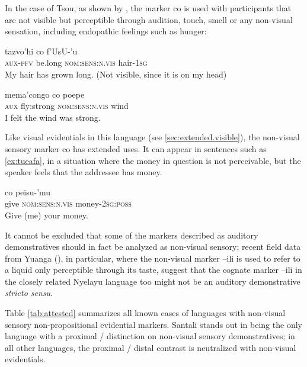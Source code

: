 \documentclass[oneside,a4paper,11pt]{article}
\newcommand{\ipa}[1]{{\phon \mbox{#1}}} %
\begin{document}
In the case of Tsou, as shown by \citet[50-1]{yang00tsou.case}, the marker \ipa{co} is used with participants that are not visible but perceptible through audition, touch, smell or any non-visual sensation, including endopathic feelings such as hunger:


\begin{exe}
\ex 
\gll \ipa{mi-cu} \ipa{tazvo'hi} \ipa{co} \ipa{f'UsU-'u} \\
\textsc{aux-pfv} be.long \textsc{nom:sens:n.vis} hair-\textsc{1sg} \\
\glt My hair has grown long. (Not visible, since it is on my head)
\end{exe}

\begin{exe}
\ex 
\gll \ipa{mo} \ipa{mema'congo} \ipa{co} \ipa{poepe} \\
\textsc{aux} fly:strong \textsc{nom:sens:n.vis} wind \\
\glt I felt the wind was strong.
\end{exe}

Like visual evidentials in this language (see \ref{sec:extended.visible}), the non-visual sensory marker \ipa{co} has extended uses. It can appear in sentences such as \ref{ex:tueafa}, in a situation where the money in question is not perceivable, but the speaker feels that the addressee has money.

\begin{exe}
\ex  \label{ex:tueafa}
\gll \ipa{tueafa}   \ipa{co} \ipa{peisu-'mu} \\
give \textsc{nom:sens:n.vis} money-\textsc{2sg:poss} \\
\glt Give (me) your money.
\end{exe}

It cannot be excluded that some of the markers described as auditory demonstratives should in fact be analyzed as non-visual sensory; recent field data from Yuanga (\citealt{bril-yuanga}), in particular, where the non-visual marker  \ipa{--ili} is used to refer to a liquid only perceptible through its taste, suggest that the cognate marker \ipa{--ili} in the closely related Nyelayu language too might not be an auditory demonstrative \textit{stricto sensu}.


Table \ref{tab:attested} summarizes all known cases of languages with non-visual sensory non-propositional evidential markers.  Santali stands out in being the only language with a proximal / distinction on non-visual sensory demonstratives; in all other languages, the proximal / distal contrast is neutralized with non-visual evidentials. 
\end{document}

